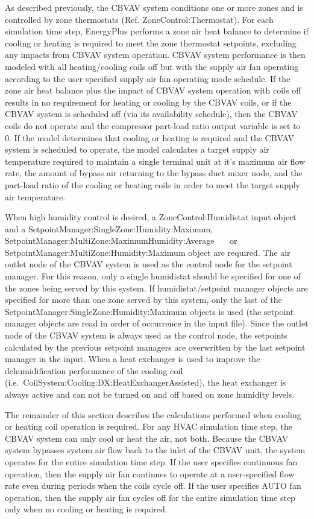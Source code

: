 As described previously, the CBVAV system conditions one or more zones and is controlled by zone thermostats (Ref. ZoneControl:Thermostat). For each simulation time step, EnergyPlus performs a zone air heat balance to determine if cooling or heating is required to meet the zone thermostat setpoints, excluding any impacts from CBVAV system operation. CBVAV system performance is then modeled with all heating/cooling coils off but with the supply air fan operating according to the user specified supply air fan operating mode schedule. If the zone air heat balance plus the impact of CBVAV system operation with coils off results in no requirement for heating or cooling by the CBVAV coils, or if the CBVAV system is scheduled off (via its availability schedule), then the CBVAV coils do not operate and the compressor part-load ratio output variable is set to 0. If the model determines that cooling or heating is required and the CBVAV system is scheduled to operate, the model calculates a target supply air temperature required to maintain a single terminal unit at it's maximum air flow rate, the amount of bypass air returning to the bypass duct mixer node, and the part-load ratio of the cooling or heating coils in order to meet the target supply air temperature.

When high humidity control is desired, a ZoneControl:Humidistat input object and a SetpointManager:SingleZone:Humidity:Maximum, SetpointManager:MultiZone:MaximumHumidity:Average~ ~~or SetpointManager:MultiZone:Humidity:Maximum object are required. The air outlet node of the CBVAV system is used as the control node for the setpoint manager. For this reason, only a single humidistat should be specified for one of the zones being served by this system. If humidistat/setpoint manager objects are specified for more than one zone served by this system, only the last of the SetpointManager:SingleZone:Humidity:Maximum objects is used (the setpoint manager objects are read in order of occurrence in the input file). Since the outlet node of the CBVAV system is always used as the control node, the setpoints calculated by the previous setpoint managers are overwritten by the last setpoint manager in the input. When a heat exchanger is used to improve the dehumidification performance of the cooling coil (i.e.~CoilSystem:Cooling:DX:HeatExchangerAssisted), the heat exchanger is always active and can not be turned on and off based on zone humidity levels.

The remainder of this section describes the calculations performed when cooling or heating coil operation is required. For any HVAC simulation time step, the CBVAV system can only cool or heat the air, not both. Because the CBVAV system bypasses system air flow back to the inlet of the CBVAV unit, the system operates for the entire simulation time step. If the user specifies continuous fan operation, then the supply air fan continues to operate at a user-specified flow rate even during periods when the coils cycle off. If the user specifies AUTO fan operation, then the supply air fan cycles off for the entire simulation time step only when no cooling or heating is required.

